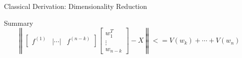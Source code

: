 \documentclass[10pt]{beamer}
\theoremstyle{definition}
\newcommand{\1}{\mathbbm{1}}
\begin{document}
\begin{frame}{Classical Derivation: Dimensionality Reduction}
  \begin{block}{Summary}{}
    \[
      \left\|
      \begin{bmatrix}
        f^{(1)} &|\cdots|& f^{(n-k)}
      \end{bmatrix}
      \begin{bmatrix}
        w_1^T\\
        \vdots\\
        w_{n-k}
      \end{bmatrix} - X\right\|<=V(w_k)+\cdots+V(w_n)
    \]
  \end{block}
\end{frame}
\end{document}
